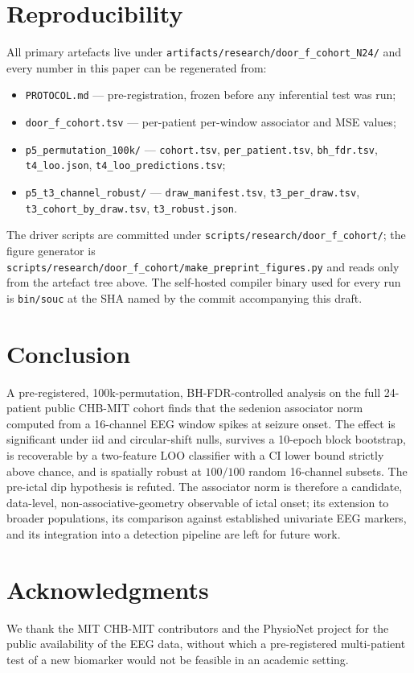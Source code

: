 \documentclass[11pt,twocolumn]{article}
\begin{document}
\section{Reproducibility}\label{sec:reproducibility}
All primary artefacts live under
\texttt{artifacts/research/door\_f\_cohort\_N24/} and every
number in this paper can be regenerated from:
\begin{itemize}
\item \texttt{PROTOCOL.md} --- pre-registration, frozen before
      any inferential test was run;
\item \texttt{door\_f\_cohort.tsv} --- per-patient per-window
      associator and MSE values;
\item \texttt{p5\_permutation\_100k/} ---
      \texttt{cohort.tsv}, \texttt{per\_patient.tsv},
      \texttt{bh\_fdr.tsv}, \texttt{t4\_loo.json},
      \texttt{t4\_loo\_predictions.tsv};
\item \texttt{p5\_t3\_channel\_robust/} ---
      \texttt{draw\_manifest.tsv},
      \texttt{t3\_per\_draw.tsv},
      \texttt{t3\_cohort\_by\_draw.tsv},
      \texttt{t3\_robust.json}.
\end{itemize}
The driver scripts are committed under
\texttt{scripts/research/door\_f\_cohort/}; the figure generator
is \texttt{scripts/research/door\_f\_cohort/make\_preprint\_figures.py}
and reads only from the artefact tree above. The self-hosted
compiler binary used for every run is \texttt{bin/souc} at the
SHA named by the commit accompanying this draft.

\section{Conclusion}
A pre-registered, 100k-permutation, BH-FDR-controlled analysis
on the full 24-patient public CHB-MIT cohort finds that the
sedenion associator norm computed from a 16-channel EEG window
spikes at seizure onset. The effect is significant under iid
and circular-shift nulls, survives a 10-epoch block bootstrap,
is recoverable by a two-feature LOO classifier with a CI lower
bound strictly above chance, and is spatially robust at
$100/100$ random 16-channel subsets. The pre-ictal dip
hypothesis is refuted. The associator norm is therefore a
candidate, data-level, non-associative-geometry observable of
ictal onset; its extension to broader populations, its
comparison against established univariate EEG markers, and its
integration into a detection pipeline are left for future work.

\section*{Acknowledgments}
We thank the MIT CHB-MIT contributors \cite{shoeb2009} and the
PhysioNet project \cite{goldberger2000physionet} for the public
availability of the EEG data, without which a pre-registered
multi-patient test of a new biomarker would not be feasible in
an academic setting.
\end{document}
